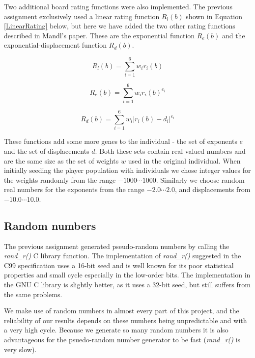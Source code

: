 \documentclass[a4paper,11pt]{article}
\begin{document}
Two additional board rating functions were also implemented.
The previous assignment exclusively used a linear rating function $R_l(b)$
shown in Equation \ref{LinearRating} below, but here we have added the two
other rating functions described in Mandl's paper.
These are the exponential function $R_e(b)$ and the exponential-displacement
function $R_d(b)$.


\begin{equation}
\label{LinearRating}
  R_l(b) = \sum^6_{i=1} w_ir_i(b)
\end{equation}

\begin{equation}
\label{ExponentialRating}
  R_e(b) = \sum^6_{i=1} w_ir_i(b)^{e_i}
\end{equation}

\begin{equation}
\label{DisplacementRating}
  R_d(b) = \sum^6_{i=1} w_i \lvert r_i(b) - d_i \rvert ^{e_i}
\end{equation}

These functions add some more genes to the individual - the set of exponents
$e$ and the set of displacements $d$.
Both these sets contain real-valued numbers and are the same size as the set of
weights $w$ used in the original individual.
When initially seeding the player population with individuals we chose integer
values for the weights randomly from the range $-1000 \cdots 1000$.
Similarly we choose random real numbers for the exponents from the range
$-2.0 \cdots 2.0$, and displacements from $-10.0 \cdots 10.0$.

\subsection{Random numbers}

The previous assignment generated pseudo-random numbers by calling the
\emph{rand\_r()} C library function.
The implementation of \emph{rand\_r()} suggested in the C99 specification
\cite{C99} uses a 16-bit seed and is well known for its poor statistical
properties and small cycle especially in the low-order bits.
The implementation in the GNU C library is slightly better, as it uses a 32-bit
seed, but still suffers from the same problems.

We make use of random numbers in almost every part of this project, and the
reliability of our results depends on these numbers being unpredictable and with
a very high cycle.
Because we generate so many random numbers it is also advantageous for the
psuedo-random number generator to be fast (\emph{rand\_r()} is very slow).
\end{document}
